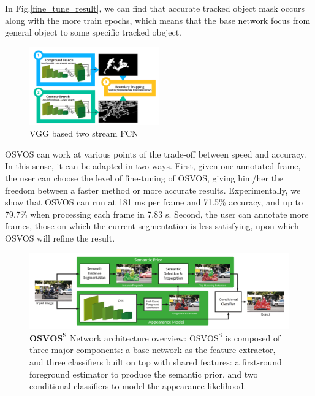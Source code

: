 In Fig.\ref{fine_tune_result}, we can find that accurate tracked object mask occurs along with the more train epochs, which means that the base network focus from general object to some specific tracked obeject.

\begin{figure}[ht]
    \centering
    \includegraphics[width=0.5\textwidth]{./figure/osvos_fcn.png}
    \caption{VGG based two stream FCN}
    \label{osvos_fcn}
\end{figure}

OSVOS can work at various points of the trade-off between speed and accuracy. In this sense, it can be adapted in two ways. First, given one annotated frame, the user can choose the level of fine-tuning of OSVOS, giving him/her the freedom between a faster method or more accurate results. Experimentally, we show that OSVOS can run at 181 ms per frame and 71.5\% accuracy, and up to 79.7\% when processing each frame in 7.83 s. Second, the user can annotate more frames, those on which the current segmentation is less satisfying, upon which OSVOS will refine the result.

\begin{figure}[ht]
    \centering
    \includegraphics[width=\textwidth]{./figure/OSVOS_S.png}
    \caption{$\textbf{OSVOS}^\textbf{S}$ Network architecture overview: $\text{OSVOS}^\text{S}$ is composed of three major components: a base network as the feature extractor, and three classifiers built on top with shared features: a first-round foreground estimator to produce the semantic prior, and two conditional classifiers to model the appearance likelihood.}
    \label{OSVOS_S}
\end{figure}


